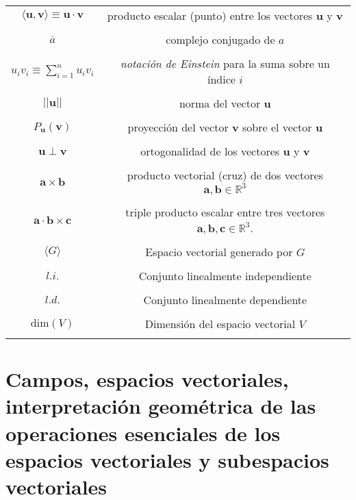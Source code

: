 \documentclass[12pt,dvipsnames]{article}
\begin{document}
\begin{tcolorbox}
\begin{tabular}{cc}
    $\langle\mathbf{u},\mathbf{v}\rangle \equiv \mathbf{u}\cdot\mathbf{v}$ & producto escalar (punto) entre los vectores $\mathbf{u}$ y $\mathbf{v}$ \\ \\
    $\overline{a}$ & complejo conjugado de $a$ \\ \\
    $u_i v_i \equiv \sum_{i=1}^n u_i v_i$ & \textit{notación de Einstein} para la suma sobre un índice $i$ \\ \\
    $||\mathbf{u}||$ & norma del vector $\mathbf{u}$ \\ \\
    $P_{\mathbf{u}}(\mathbf{v})$ & proyección del vector $\mathbf{v}$ sobre el vector $\mathbf{u}$ \\ \\
    $\mathbf{u}\perp\mathbf{v}$ & ortogonalidad de los vectores $\mathbf{u}$ y $\mathbf{v}$ \\ \\
    $\mathbf{a}\times\mathbf{b}$ & producto vectorial (cruz) de dos vectores $\mathbf{a},\mathbf{b}\in\mathbb{R}^3$ \\ \\
    $\mathbf{a}\cdot\mathbf{b}\times\mathbf{c}$ & triple producto escalar entre tres vectores $\mathbf{a},\mathbf{b},\mathbf{c}\in\mathbb{R}^3$. \\ \\


    $\langle G \rangle $ & Espacio vectorial generado por $G$ \\ \\
    $l.i.$ & Conjunto linealmente independiente \\ \\
    $l.d.$ & Conjunto linealmente dependiente \\ \\

    $\text{dim}(V)$ & Dimensión del espacio vectorial $V$ \\ \\

\end{tabular}
\end{tcolorbox}

\newpage
\section{Campos, espacios vectoriales, interpretación geométrica de las operaciones esenciales de los espacios vectoriales y subespacios vectoriales} \label{Sec:1}
\end{document}
